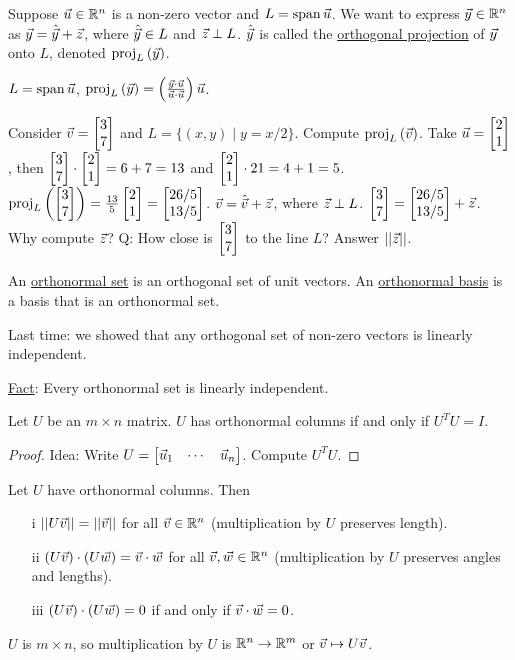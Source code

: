 \documentclass[10pt,a4paper]{article}
\begin{document}
\begin{example}
	Suppose $\vec{u}\in\mathbb{R}^n$ is a non-zero vector and $L=\text{span}\,\vec{u}$. We want to express $\vec{y}\in\mathbb{R}^n$ as $\vec{y}=\hat{\vec{y}} + \vec{z}$, where $\hat{\vec{y}}\in L$ and $\vec{z}\perp L$. $\hat{\vec{y}}$ is called the \underline{orthogonal projection} of $\vec{y}$ onto $L$, denoted $\text{proj}_{L}\left(\vec{y}\right)$.
	
	$L = \text{span}\,\vec{u}$, $\text{proj}_{L}\left(\vec{y}\right) = \left( \frac{\vec{y}\cdot\vec{u}}{\vec{u}\cdot\vec{u}} \right) \vec{u}$.
\end{example}
\begin{example}
	Consider $\vec{v} = \begin{bmatrix}3\\7\end{bmatrix}$ and $L = \{(x,y)\mid y=x/2\}$. Compute $\text{proj}_{L}\left(\vec{v}\right)$. Take $\vec{u} = \begin{bmatrix}2\\1\end{bmatrix}$, then $\begin{bmatrix}3\\7\end{bmatrix}\cdot\begin{bmatrix}2\\1\end{bmatrix} = 6 + 7 = 13$ and $\begin{bmatrix}2\\1\end{bmatrix}\cdot{2\\1} = 4 + 1 = 5$.
	$\text{proj}_{L}\left(\begin{bmatrix}3\\7\end{bmatrix}\right) = \frac{13}{5}\begin{bmatrix}2\\1\end{bmatrix} = \begin{bmatrix}26/5\\13/5\end{bmatrix}$.
	$\vec{v}=\hat{\vec{v}} + \vec{z}$, where $\vec{z}\perp L$. $\begin{bmatrix}3\\7\end{bmatrix} = \begin{bmatrix}26/5\\13/5\end{bmatrix} + \vec{z}$. Why compute $\vec{z}$? Q: How close is $\begin{bmatrix}3\\7\end{bmatrix}$ to the line $L$? Answer $||\vec{z}||$.
\end{example}

\begin{definition}
	An \underline{orthonormal set} is an orthogonal set of unit vectors. An \underline{orthonormal basis} is a basis that is an orthonormal set.
\end{definition}
\begin{remark}
	Last time: we showed that any orthogonal set of non-zero vectors is linearly independent.
\end{remark}
\underline{Fact}: Every orthonormal set is linearly independent.
\begin{theorem}
	Let $U$ be an $m\times n$ matrix. $U$ has orthonormal columns if and only if $U^TU=I$.
\end{theorem}
\begin{proof}
	Idea: Write $U = \begin{bmatrix}\vec{u}_1&\cdots& \vec{u}_n\end{bmatrix}$. Compute $U^TU$.
\end{proof}
\begin{theorem}
	Let $U$ have orthonormal columns. Then
	\begin{enumerate}
		\item[i] $||U\vec{v}||=||\vec{v}||$ for all $\vec{v}\in\mathbb{R}^n$ (multiplication by $U$ preserves length).
		\item[ii] $(U\vec{v})\cdot(U\vec{w})=\vec{v}\cdot\vec{w}$ for all $\vec{v},\vec{w}\in\mathbb{R}^n$ (multiplication by $U$ preserves angles and lengths).
		\item[iii] $(U\vec{v})\cdot(U\vec{w})=0$ if and only if $\vec{v}\cdot\vec{w}=0$.
	\end{enumerate}
\end{theorem}
\begin{note}
	$U$ is $m\times n$, so multiplication by $U$ is $\mathbb{R}^n \rightarrow \mathbb{R}^m$ or $\vec{v} \mapsto U\vec{v}$.
\end{note}
\end{document}
